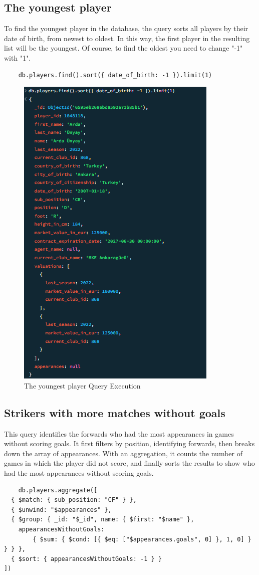 \documentclass{Configuration_Files/PoliMi3i_thesis}
\begin{document}
\subsection{The youngest player}
To find the youngest player in the database, the query sorts all players by their date of birth, from newest to oldest. In this way, the first player in the resulting list will be the youngest. Of course, to find the oldest you need to change "-1" with "1".
\begin{verbatim}
    db.players.find().sort({ date_of_birth: -1 }).limit(1)
\end{verbatim}

\begin{figure}[htbp]
    \centering
    \includegraphics[scale=1]{Images/Queries/Youngest/y.png}
    \caption{The youngest player Query Execution}
\end{figure}

\subsection{Strikers with more matches without goals}
This query identifies the forwards who had the most appearances in games without scoring goals. It first filters by position, identifying forwards, then breaks down the array of appearances. With an aggregation, it counts the number of games in which the player did not score, and finally sorts the results to show who had the most appearances without scoring goals. 
\begin{verbatim}
    db.players.aggregate([
  { $match: { sub_position: "CF" } },
  { $unwind: "$appearances" },
  { $group: { _id: "$_id", name: { $first: "$name" },
    appearancesWithoutGoals: 
        { $sum: { $cond: [{ $eq: ["$appearances.goals", 0] }, 1, 0] } } } },
  { $sort: { appearancesWithoutGoals: -1 } }
])
\end{verbatim}
\end{document}
